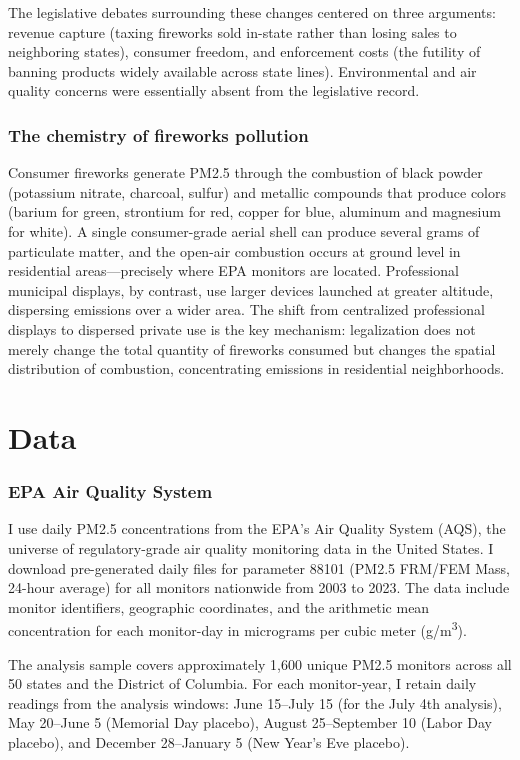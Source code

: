 \documentclass[12pt]{article}
\begin{document}
The legislative debates surrounding these changes centered on three arguments: revenue capture (taxing fireworks sold in-state rather than losing sales to neighboring states), consumer freedom, and enforcement costs (the futility of banning products widely available across state lines). Environmental and air quality concerns were essentially absent from the legislative record.

\subsubsection*{The chemistry of fireworks pollution} Consumer fireworks generate PM2.5 through the combustion of black powder (potassium nitrate, charcoal, sulfur) and metallic compounds that produce colors (barium for green, strontium for red, copper for blue, aluminum and magnesium for white). A single consumer-grade aerial shell can produce several grams of particulate matter, and the open-air combustion occurs at ground level in residential areas---precisely where EPA monitors are located. Professional municipal displays, by contrast, use larger devices launched at greater altitude, dispersing emissions over a wider area. The shift from centralized professional displays to dispersed private use is the key mechanism: legalization does not merely change the total quantity of fireworks consumed but changes the spatial distribution of combustion, concentrating emissions in residential neighborhoods.


\section{Data}

\subsubsection*{EPA Air Quality System} I use daily PM2.5 concentrations from the EPA's Air Quality System (AQS), the universe of regulatory-grade air quality monitoring data in the United States. I download pre-generated daily files for parameter 88101 (PM2.5 FRM/FEM Mass, 24-hour average) for all monitors nationwide from 2003 to 2023. The data include monitor identifiers, geographic coordinates, and the arithmetic mean concentration for each monitor-day in micrograms per cubic meter (\textmu g/m\textsuperscript{3}).

The analysis sample covers approximately 1,600 unique PM2.5 monitors across all 50 states and the District of Columbia. For each monitor-year, I retain daily readings from the analysis windows: June 15--July 15 (for the July 4th analysis), May 20--June 5 (Memorial Day placebo), August 25--September 10 (Labor Day placebo), and December 28--January 5 (New Year's Eve placebo).
\end{document}
